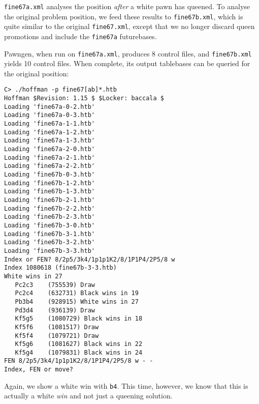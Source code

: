 \documentclass[11pt]{article}
\begin{document}
{\tt fine67a.xml} analyses the position {\it after} a white pawn has
queened.  To analyse the original problem position, we feed these
results to {\tt fine67b.xml}, which is quite similar to the original
{\tt fine67.xml}, except that we no longer discard queen promotions
and include the {\tt fine67a} futurebases.

Pawngen, when run on {\tt fine67a.xml}, produces 8 control files, and
{\tt fine67b.xml} yields 10 control files.  When complete, its output
tablebases can be queried for the original position:

\begin{verbatim}
C> ./hoffman -p fine67[ab]*.htb
Hoffman $Revision: 1.15 $ $Locker: baccala $
Loading 'fine67a-0-2.htb'
Loading 'fine67a-0-3.htb'
Loading 'fine67a-1-1.htb'
Loading 'fine67a-1-2.htb'
Loading 'fine67a-1-3.htb'
Loading 'fine67a-2-0.htb'
Loading 'fine67a-2-1.htb'
Loading 'fine67a-2-2.htb'
Loading 'fine67b-0-3.htb'
Loading 'fine67b-1-2.htb'
Loading 'fine67b-1-3.htb'
Loading 'fine67b-2-1.htb'
Loading 'fine67b-2-2.htb'
Loading 'fine67b-2-3.htb'
Loading 'fine67b-3-0.htb'
Loading 'fine67b-3-1.htb'
Loading 'fine67b-3-2.htb'
Loading 'fine67b-3-3.htb'
Index or FEN? 8/2p5/3k4/1p1p1K2/8/1P1P4/2P5/8 w
Index 1080618 (fine67b-3-3.htb)
White wins in 27
   Pc2c3    (755539) Draw
   Pc2c4    (632731) Black wins in 19
   Pb3b4    (928915) White wins in 27
   Pd3d4    (936139) Draw
   Kf5g5    (1080729) Black wins in 18
   Kf5f6    (1081517) Draw
   Kf5f4    (1079721) Draw
   Kf5g6    (1081627) Black wins in 22
   Kf5g4    (1079831) Black wins in 24
FEN 8/2p5/3k4/1p1p1K2/8/1P1P4/2P5/8 w - -
Index, FEN or move? 
\end{verbatim}

Again, we show a white win with {\tt b4}.  This time, however, we know
that this is actually a white {\it win} and not just a queening
solution.

\end{document}
